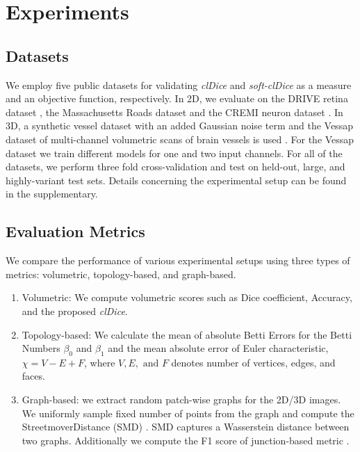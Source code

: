 \section{Experiments}
\subsection{Datasets} 
We employ five public datasets for validating \textit{clDice} and \textit{soft-clDice} as a measure and an objective function, respectively. In 2D, we evaluate on the DRIVE retina dataset \cite{staal2004ridge}, the Massachusetts Roads dataset \cite{MnihThesis} and the CREMI neuron dataset \cite{Funke_2019}. In 3D, a synthetic vessel dataset with an added Gaussian noise term \cite{schneider2012tissue} and the Vessap dataset of multi-channel volumetric scans of brain vessels is used \cite{todorov2019automated,paetzold2019transfer}. For the Vessap dataset we train different models for one and two input channels. 
%
For all of the datasets, we perform three fold cross-validation and test on held-out, large, and highly-variant test sets. Details concerning the experimental setup can be found in the supplementary.
\subsection{Evaluation Metrics}
We compare the performance of various experimental setups using three types of metrics: volumetric, topology-based, and graph-based. 
\begin{enumerate}[itemsep=0pt,parsep=0pt]
    \item Volumetric: We compute volumetric scores such as Dice coefficient, Accuracy, and the proposed \textit{clDice}.
    \item Topology-based: We calculate the mean of absolute Betti Errors for the Betti Numbers $\beta_0$ and $\beta_1$ and the mean absolute error of Euler characteristic, $\chi = V-E+F$, where $V, E, \mbox{ and } F$ denotes number of vertices, edges, and faces.
    \item Graph-based: we extract random patch-wise graphs for the 2D/3D images. We uniformly sample fixed number of points from the graph and compute the StreetmoverDistance (SMD) \cite{belli2019image}. SMD captures a Wasserstein distance between two graphs. Additionally we compute the F1 score of junction-based metric \cite{citrarotowards}.
\end{enumerate}

